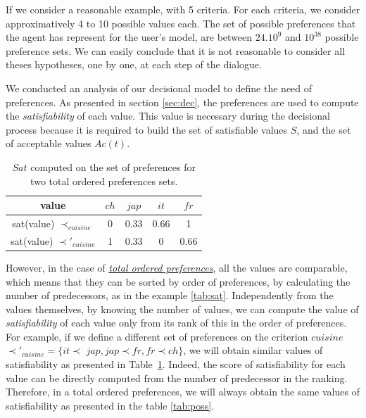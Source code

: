 \documentclass[conference, letterpaper]{IEEEtran}
\begin{document}
		If we consider a reasonable example, with 5 criteria. For each criteria, we consider approximatively 4 to 10 possible values each. The set of possible preferences that the agent has represent for the user's model, are between $24.10^9$ and $10^{38}$ possible preference sets. 
		We can easily conclude that it is not reasonable to consider all theses hypotheses, one by one, at each step of the dialogue.
	

		We conducted an analysis of our decisional model to define the need of preferences. As presented in section \ref{sec:dec}, the preferences are used to compute the \emph{satisfiability} of each value. %
		 This value is necessary during the decisional process because it is required to build the set of satisfiable values $S$, and the set of acceptable values $Ac(t)$.   
		 
		 	\begin{table} [h]
		 		\centering
		 		\large
		 		\begin{tabular}{ |c|c|c|c|c| }
		 			\hline
		 			value & $ch$ & $jap$ & $it$ & $fr$ \\	
		 			\hline
		 			sat(value) $\prec_{cuisine}$ & 0 & 0.33 & 0.66 & 1 \\
		 			\hline
		 			sat(value) $\prec'_{cuisine}$ & 1 & 0.33 & 0 & 0.66 \\
		 			\hline
		 		\end{tabular}
		 		\caption{$Sat$ computed on the set of preferences for two total ordered preferences sets.}
		 		\label{tab:ex2_sat}
		 		
		 	\end{table}
	
		However, in the case of \underline{\textit{total ordered preferences}}, all the values are comparable, which means that they can be sorted by order of preferences, by calculating the number of predecessors, as in the example \ref{tab:sat}. Independently from the values themselves, by knowing the number of values, we can compute the value of \emph{satisfiability} of each value only from its rank of this in the order of preferences. For example, if we define a different set of preferences  on the criterion $cuisine$ $\prec'_{cuisine} = \{it$$\prec$ $jap, jap$$\prec$$ fr, fr$$\prec$$ch\}$, we will obtain similar values of satisfiability as presented in Table~\ref{tab:ex2_sat}. Indeed, the score of satisfiability for each value can be directly computed from the number of predecessor in the ranking. Therefore, in a total ordered preferences, we will always obtain the same values of satisfiability as presented in the table \ref{tab:poss}. 
\end{document}
